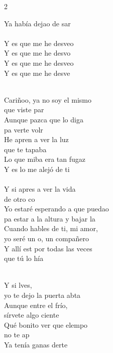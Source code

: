 \documentclass[11pt]{article}
\begin{document}
\begin{multicols*}{2}
\begin{cancion}[Desvelao][Serko]
\begin{chorus}
	Ya había dejao de sar\\
\jump\\
	Y es que me he desveo\\
	Y es que me he desvo\\
	Y es que me he desveo \\
	Y es que me he desve\\
	\end{chorus}%
	\jump\\
	Cariñoo, ya no soy el mismo  \\
	que viste par\\
	Aunque pazca que lo diga \\
	pa verte volr\\
	He apren a ver la luz \\
	que te tapaba \\
	Lo que miba era tan fugaz\\
	Y es lo  me alejó de ti\\
\jump\\
	Y si apres a ver la vida \\
	de otro co\\
	Yo estaré esperando a que puedao \\
	pa estar a la altura y bajar la \\
	Cuando hables de ti, mi amor, \\
	yo seré un o, un compañero\\
	Y allí est por todas las veces  \\
	que tú lo hía\\\jump\\
	\begin{chorus}%
	Y si lves, \\
	yo te dejo la puerta abta\\
Aunque entre el frío, \\
	sírvete algo ciente\\
	Qué bonito ver que elempo \\
	no te ap \\
	Ya tenía ganas derte\\

\end{chorus}
\end{cancion}
\end{multicols*}
\end{document}
